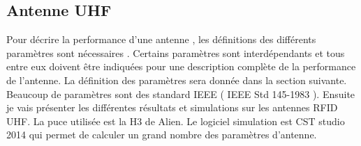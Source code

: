 \documentclass[11pt, a4paper, twoside]{book}
\begin{document}
\subsection{Antenne UHF}

Pour décrire la performance d'une antenne , les définitions des différents paramètres sont nécessaires . Certains paramètres sont interdépendants et  
tous entre eux doivent être indiquées pour une description complète de la performance de l'antenne. La définition des paramètres sera donnée dans la section suivante. Beaucoup de paramètres sont des standard IEEE  ( IEEE Std 145-1983 ). Ensuite je vais présenter les différentes résultats et simulations sur les antennes RFID UHF. La puce utilisée est la H3 de Alien. Le logiciel  simulation est CST studio 2014 qui permet de calculer un grand nombre des paramètres d'antenne.\\
\end{document}
